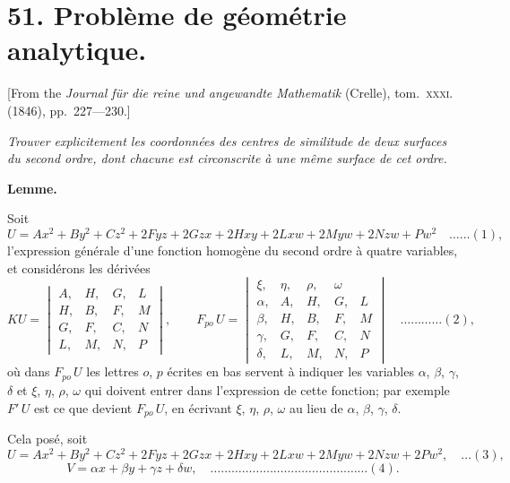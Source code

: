 \documentclass[11pt,a4paper]{book}
\begin{document}
\newpage


\section*{51. Probl\`eme de g\'eom\'etrie analytique.}

[From the \textit{Journal f\"ur die reine und angewandte Mathematik} (Crelle), tom.~\textsc{xxxi}. (1846), pp.~227---230.]

\bigskip

\textit{Trouver explicitement les coordonn\'ees des centres de similitude de deux surfaces du second ordre, dont chacune est circonscrite \`a une m\^eme surface de cet ordre.}

\medskip
\textbf{Lemme.}

Soit
\[
U = Ax^2 + By^2 + Cz^2 + 2Fyz + 2Gzx + 2Hxy + 2Lxw + 2Myw + 2Nzw + Pw^2 \quad \ldots \ldots (1),
\]
l'expression g\'en\'erale d'une fonction homog\`ene du second ordre \`a quatre variables, et consid\'erons les d\'eriv\'ees
\[
KU = \begin{vmatrix}
A, & H, & G, & L \\
H, & B, & F, & M \\
G, & F, & C, & N \\
L, & M, & N, & P
\end{vmatrix}, \qquad
F_{po}\, U = \begin{vmatrix}
\xi, & \eta, & \rho, & \omega \\
\alpha, & A, & H, & G, & L \\
\beta, & H, & B, & F, & M \\
\gamma, & G, & F, & C, & N \\
\delta, & L, & M, & N, & P
\end{vmatrix} \quad \ldots \ldots \ldots \ldots (2),
\]
o\`u dans $F_{po}\, U$ les lettres $o$, $p$ \'ecrites en bas servent \`a indiquer les variables $\alpha$, $\beta$, $\gamma$, $\delta$ et $\xi$, $\eta$, $\rho$, $\omega$ qui doivent entrer dans l'expression de cette fonction; par exemple $F'\, U$ est ce que devient $F_{po}\, U$, en \'ecrivant $\xi$, $\eta$, $\rho$, $\omega$ au lieu de $\alpha$, $\beta$, $\gamma$, $\delta$.

Cela pos\'e, soit
\[
U = Ax^2 + By^2 + Cz^2 + 2Fyz + 2Gzx + 2Hxy + 2Lxw + 2Myw + 2Nzw + 2Pw^2, \quad \ldots (3),
\]
\[
V = \alpha x + \beta y + \gamma z + \delta w, \quad \ldots \ldots \ldots \ldots \ldots \ldots \ldots \ldots \ldots \ldots \ldots \ldots \ldots \ldots \ldots (4).
\]
\end{document}

